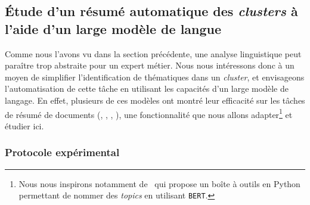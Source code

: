 	\subsection{Étude d'un résumé automatique des \textit{clusters} à l'aide d'un large modèle de langue}
	\label{section:4.4.3-ETUDE-PERTINENCE-RESUME-AUTOMATIQUE}
		
		Comme nous l'avons vu dans la section précédente, une analyse linguistique peut paraître trop abstraite pour un expert métier.
		Nous nous intéressons donc à un moyen de simplifier l'identification de thématiques dans un \textit{cluster}, et envisageons l'automatisation de cette tâche en utilisant les capacités d'un large modèle de langage.
		En effet, plusieurs de ces modèles ont montré leur efficacité sur les tâches de résumé de documents (\cite{zhang-etal:2019:pegasus-pretraining-extracted}, \cite{lewis-etal:2019:bart-denoising-sequencetosequence}, \cite{radford-etal:2019:language-models-are}, \cite{brown-etal:2020:language-models-are}), une fonctionnalité que nous allons adapter\footnote{Nous nous inspirons notamment de~\cite{alammar-grefenstette:2022:cohere-sandbox} qui propose un boîte à outils en Python permettant de nommer des \textit{topics} en utilisant \texttt{BERT}.} et étudier ici.
	
		\subsubsection{Protocole expérimental}
			
